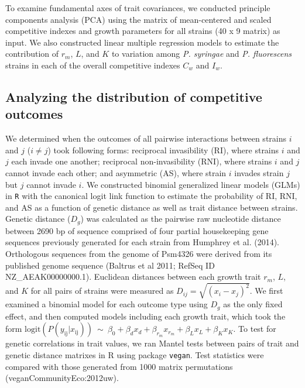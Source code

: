 \documentclass[%
preprint,
superscriptaddress,
 amsmath,amssymb,
 aps,
]{revtex4-1}
\begin{document}
To examine fundamental axes of trait covariances, we conducted principle components analysis (PCA) using the matrix of mean-centered and scaled competitive indexes and growth parameters for all strains (40 x 9 matrix) as input. We also constructed linear multiple regression models to estimate the contribution of $r_m$, $L$, and $K$ to variation among \emph{P. syringae} and \emph{P. fluorescens} strains in each of the overall competitive indexes $C_w$ and $I_w$.

\subsection*{Analyzing the distribution of competitive outcomes}

We determined when the outcomes of all pairwise interactions between strains $i$ and $j$ ($i \neq j$) took following forms: reciprocal invasibility (RI), where strains $i$ and $j$ each invade one another; reciprocal non-invasibility (RNI), where strains $i$ and $j$ cannot invade each other; and asymmetric (AS), where strain $i$ invades strain $j$ but $j$ cannot invade $i$. We constructed binomial generalized linear models (GLMs) in \texttt{R} with the canonical logit link function to estimate the probability of RI, RNI, and AS as a function of genetic distance as well as trait distance between strains. Genetic distance ($D_g$) was calculated as the pairwise raw nucleotide distance between 2690 bp of sequence comprised of four partial housekeeping gene sequences previously generated for each strain from Humphrey et al. (2014). Orthologous sequences from the genome of Psm4326 were derived from its published genome sequence (Baltrus et al 2011; RefSeq ID NZ\_AEAK00000000.1). Euclidean distances between each growth trait $r_m$, $L$, and $K$ for all pairs of strains were measured as $D_{ij} = \sqrt{{(x_{i} - x_{j})}^{2}}$. We first examined a binomial model for each outcome type using $D_g$ as the only fixed effect, and then computed models including each growth trait, which took the form \(\text{logit}\left( P(y_{\text{ij}}|x_{\text{ij}}) \right)\ \sim\ \beta_{0} + \beta_{d}x_{d} + \beta_{r_{m}}x_{r_{m}} + \beta_{L}x_{L} + \beta_{K}x_{K}\). To test for genetic correlations in trait values, we ran Mantel tests between pairs of trait and genetic distance matrixes in R using package \texttt{vegan}. Test statistics were compared with those generated from 1000 matrix permutations (veganCommunityEco:2012uw).
\end{document}
